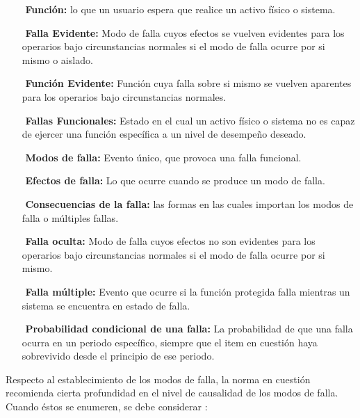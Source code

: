 \begin{itemize}
\item[$ $] \textbf{Función:} lo que un usuario espera que realice un activo físico o sistema.
\item[$ $] \textbf{Falla Evidente:} Modo de falla cuyos efectos se vuelven evidentes para los operarios bajo circunstancias normales si el modo de falla ocurre por si mismo o aislado.
\item[$ $] \textbf{Función Evidente:} Función cuya falla sobre si mismo se vuelven aparentes para los operarios bajo circunstancias normales.
\item[$ $] \textbf{Fallas Funcionales:} Estado en el cual un activo físico o sistema no es capaz de ejercer una función específica a un nivel de desempeño deseado.
\item[$ $] \textbf{Modos de falla:} Evento único, que provoca una falla funcional.
\item[$ $] \textbf{Efectos de falla:} Lo que ocurre cuando se produce un modo de falla.
\item[$ $] \textbf{Consecuencias de la falla:} las formas en las cuales importan los modos de falla o múltiples fallas. 
\item[$ $] \textbf{Falla oculta:} Modo de falla cuyos efectos no son evidentes para los operarios bajo circunstancias normales si el modo de falla ocurre por si mismo.
\item[$ $] \textbf{Falla múltiple:} Evento que ocurre si la función protegida falla mientras un sistema se encuentra en estado de falla.
\item[$ $] \textbf{Probabilidad condicional de una falla:} La probabilidad de que una falla ocurra en un periodo específico, siempre que el item en cuestión haya sobrevivido desde el principio de ese periodo.

\end{itemize}

Respecto al establecimiento de los modos de falla, la norma en cuestión recomienda cierta profundidad en el nivel de causalidad de los modos de falla. Cuando éstos se enumeren, se debe considerar \citep{saeja1011}:\\

